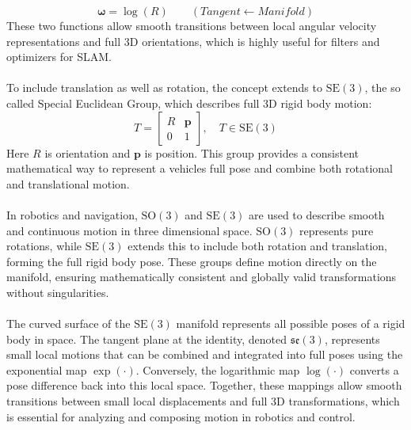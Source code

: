\begin{equation}
    \boldsymbol{\omega} = \log(R) \qquad (Tangent \leftarrow Manifold)
    \label{eq:lie-groups-and-manifold-logarithmic}
\end{equation}
These two functions allow smooth transitions between local angular velocity representations and full 3D orientations, which is highly useful for filters and optimizers for SLAM.  
\\ \\
To include translation as well as rotation, the concept extends to $\mathrm{SE}(3)$, the so called Special Euclidean Group, which describes full 3D rigid body motion:
\begin{equation}
    T =
    \begin{bmatrix}
        R & \mathbf{p} \\
        0 & 1
    \end{bmatrix},
    \quad T \in \mathrm{SE}(3)
    \label{eq:SE3-definition}
\end{equation}
\noindent
Here $R$ is orientation and $\mathbf{p}$ is position. This group provides a consistent mathematical way to represent a vehicles full pose and combine both rotational and translational motion.  
\\ \\
In robotics and navigation, $\mathrm{SO}(3)$ and $\mathrm{SE}(3)$ are used to describe smooth and continuous motion in three dimensional space. $\mathrm{SO}(3)$ represents pure rotations, while $\mathrm{SE}(3)$ extends this to include both rotation and translation, forming the full rigid body pose. These groups define motion directly on the manifold, ensuring mathematically consistent and globally valid transformations without singularities.  
\\ \\
The curved surface of the $\mathrm{SE}(3)$ manifold represents all possible poses of a rigid body in space. The tangent plane at the identity, denoted $\mathfrak{se}(3)$, represents small local motions that can be combined and integrated into full poses using the exponential map $\exp(\cdot)$. Conversely, the logarithmic map $\log(\cdot)$ converts a pose difference back into this local space. Together, these mappings allow smooth transitions between small local displacements and full 3D transformations, which is essential for analyzing and composing motion in robotics and control.  
\\ \\
